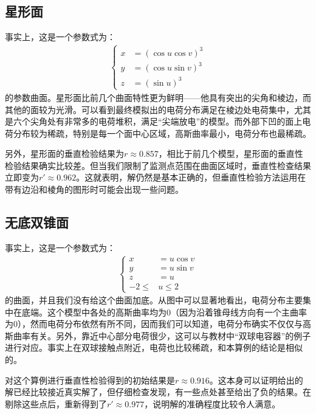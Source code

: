 \documentclass[UTF8]{article}
\numberwithin{figure}{subsection}
\numberwithin{table}{subsection}
\begin{document}
\begin{multicols}{2}
        \subsection{星形面}
        事实上，这是一个参数式为：
        \begin{align}
            \left\{
            \begin{aligned}
                x&=(\cos u\cos v)^3 \\
                y&=(\cos u\sin v)^3  \\
                z&=(\sin u)^3
            \end{aligned}   
            \right.
        \end{align}
        的参数曲面。星形面比前几个曲面特性更为鲜明——他具有突出的尖角和棱边，而其他的面较为光滑。可以看到最终模拟出的电荷分布满足在棱边处电荷集中，尤其是六个尖角处有非常多的电荷堆积，满足“尖端放电”的模型。而外部下凹的面上电荷分布较为稀疏，特别是每一个面中心区域，高斯曲率最小，电荷分布也最稀疏。
        \par 另外，星形面的垂直检验结果为$r\approx 0.857$，相比于前几个模型，星形面的垂直性检验结果确实比较差。但当我们限制了监测点范围在曲面区域时，垂直性检查结果立即变为$r'\approx 0.962$。这就表明，解仍然是基本正确的，但垂直性检验方法运用在带有边沿和棱角的图形时可能会出现一些问题。
        \subsection{无底双锥面}
        事实上，这是一个参数式为：
        \begin{align}
            \left\{
            \begin{aligned}
                x&=u\cos v \\
                y&=u\sin v  \\
                z&=u\\
                -2\leq& u\leq 2
            \end{aligned}   
            \right.
        \end{align}
        的曲面，并且我们没有给这个曲面加底。从图中可以显著地看出，电荷分布主要集中在底端。这个模型中各处的高斯曲率均为0（因为沿着锥母线方向有一个主曲率为0），然而电荷分布依然有所不同，因而我们可以知道，电荷分布确实不仅仅与高斯曲率有关。另外，靠近中心部分电荷很少，这可以与教材中“双球电容器”的例子进行对应。事实上在双球接触点附近，电荷也比较稀疏，和本算例的结论是相似的。
        \par 对这个算例进行垂直性检验得到的初始结果是$r\approx 0.916$。这本身可以证明给出的解已经比较接近真实解了，但仔细检查发现，有一些点处甚至给出了负的结果。在剔除这些点后，重新得到了$r'\approx 0.977$，说明解的准确程度比较令人满意。
    



\end{multicols}
\end{document}
